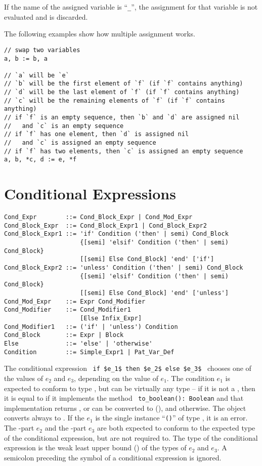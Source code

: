 If the name of the assigned variable is ``\lstinline!_!'', the assignment for that variable is not evaluated and is discarded. 

\example The following examples show how multiple assignment works. 
\begin{lstlisting}
// swap two variables
a, b := b, a

// `a` will be `e`
// `b` will be the first element of `f` (if `f` contains anything)
// `d` will be the last element of `f` (if `f` contains anything)
// `c` will be the remaining elements of `f` (if `f` contains anything)
// if `f` is an empty sequence, then `b` and `d` are assigned nil
//   and `c` is an empty sequence
// if `f` has one element, then `d` is assigned nil 
//   and `c` is assigned an empty sequence
// if `f` has two elements, then `c` is assigned an empty sequence
a, b, *c, d := e, *f
\end{lstlisting}





\section{Conditional Expressions}
\label{sec:conditional-expressions}

\syntax\begin{lstlisting}
Cond_Expr        ::= Cond_Block_Expr | Cond_Mod_Expr
Cond_Block_Expr  ::= Cond_Block_Expr1 | Cond_Block_Expr2
Cond_Block_Expr1 ::= 'if' Condition ('then' | semi) Cond_Block 
                     {[semi] 'elsif' Condition ('then' | semi) Cond_Block}
                     [[semi] Else Cond_Block] 'end' ['if']
Cond_Block_Expr2 ::= 'unless' Condition ('then' | semi) Cond_Block 
                     {[semi] 'elsif' Condition ('then' | semi) Cond_Block}
                     [[semi] Else Cond_Block] 'end' ['unless']
Cond_Mod_Expr    ::= Expr Cond_Modifier
Cond_Modifier    ::= Cond_Modifier1
                     [Else Infix_Expr]
Cond_Modifier1   ::= ('if' | 'unless') Condition 
Cond_Block       ::= Expr | Block
Else             ::= 'else' | 'otherwise'
Condition        ::= Simple_Expr1 | Pat_Var_Def
\end{lstlisting}

The conditional expression ~\lstinline!if $e_1$ then $e_2$ else $e_3$!~ chooses one of the values of $e_2$ and $e_3$, depending on the value of $e_1$. The condition $e_1$ is expected to conform to type , but can be virtually any type -- if it is not a , then it is equal to  if it implements the method ~\lstinline!to_boolean(): Boolean! and that implementation returns , or can be converted to  (), and  otherwise. The  object converts always to . If the $e_1$ is the single instance ``\lstinline!()!'' of type , it is an error. The -part $e_2$ and the -part $e_3$ are both expected to conform to the expected type of the conditional expression, but are not required to. The type of the conditional expression is the weak least upper bound () of the types of $e_2$ and $e_3$. A semicolon preceding the  symbol of a conditional expression is ignored. 

